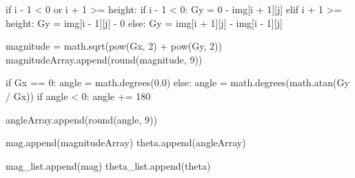 \documentclass[
  letterpaper,
  DIV=11,
  numbers=noendperiod]{scrreprt}
\newenvironment{Shaded}{\begin{snugshade}}{\end{snugshade}}
\newcommand{\BuiltInTok}[1]{\textcolor[rgb]{0.00,0.23,0.31}{#1}}
\newcommand{\ControlFlowTok}[1]{\textcolor[rgb]{0.00,0.23,0.31}{#1}}
\newcommand{\DecValTok}[1]{\textcolor[rgb]{0.68,0.00,0.00}{#1}}
\newcommand{\FloatTok}[1]{\textcolor[rgb]{0.68,0.00,0.00}{#1}}
\newcommand{\KeywordTok}[1]{\textcolor[rgb]{0.00,0.23,0.31}{#1}}
\newcommand{\NormalTok}[1]{\textcolor[rgb]{0.00,0.23,0.31}{#1}}
\newcommand{\OperatorTok}[1]{\textcolor[rgb]{0.37,0.37,0.37}{#1}}
\begin{document}
\begin{Shaded}
\begin{Highlighting}[]
            \ControlFlowTok{if}\NormalTok{ i }\OperatorTok{{-}} \DecValTok{1} \OperatorTok{\textless{}} \DecValTok{0} \KeywordTok{or}\NormalTok{ i }\OperatorTok{+} \DecValTok{1} \OperatorTok{\textgreater{}=}\NormalTok{ height:}
                \ControlFlowTok{if}\NormalTok{ i }\OperatorTok{{-}} \DecValTok{1} \OperatorTok{\textless{}} \DecValTok{0}\NormalTok{:}
\NormalTok{                    Gy }\OperatorTok{=} \DecValTok{0} \OperatorTok{{-}}\NormalTok{ img[i }\OperatorTok{+} \DecValTok{1}\NormalTok{][j]}
                \ControlFlowTok{elif}\NormalTok{ i }\OperatorTok{+} \DecValTok{1} \OperatorTok{\textgreater{}=}\NormalTok{ height:}
\NormalTok{                    Gy }\OperatorTok{=}\NormalTok{ img[i }\OperatorTok{{-}} \DecValTok{1}\NormalTok{][j] }\OperatorTok{{-}} \DecValTok{0}
            \ControlFlowTok{else}\NormalTok{:}
\NormalTok{                Gy }\OperatorTok{=}\NormalTok{ img[i }\OperatorTok{+} \DecValTok{1}\NormalTok{][j] }\OperatorTok{{-}}\NormalTok{ img[i }\OperatorTok{{-}} \DecValTok{1}\NormalTok{][j]}
                
\NormalTok{            magnitude }\OperatorTok{=}\NormalTok{ math.sqrt(}\BuiltInTok{pow}\NormalTok{(Gx, }\DecValTok{2}\NormalTok{) }\OperatorTok{+} \BuiltInTok{pow}\NormalTok{(Gy, }\DecValTok{2}\NormalTok{))}
\NormalTok{            magnitudeArray.append(}\BuiltInTok{round}\NormalTok{(magnitude, }\DecValTok{9}\NormalTok{))}
            
            \ControlFlowTok{if}\NormalTok{ Gx }\OperatorTok{==} \DecValTok{0}\NormalTok{:}
\NormalTok{                angle }\OperatorTok{=}\NormalTok{ math.degrees(}\FloatTok{0.0}\NormalTok{)}
            \ControlFlowTok{else}\NormalTok{:}
\NormalTok{                angle }\OperatorTok{=}\NormalTok{ math.degrees(math.atan(Gy }\OperatorTok{/}\NormalTok{ Gx))}
                \ControlFlowTok{if}\NormalTok{ angle }\OperatorTok{\textless{}} \DecValTok{0}\NormalTok{:}
\NormalTok{                    angle }\OperatorTok{+=} \DecValTok{180}
                    
\NormalTok{            angleArray.append(}\BuiltInTok{round}\NormalTok{(angle, }\DecValTok{9}\NormalTok{))}
            
\NormalTok{        mag.append(magnitudeArray)}
\NormalTok{        theta.append(angleArray)}
        
\NormalTok{    mag\_list.append(mag)}
\NormalTok{    theta\_list.append(theta)}
\end{Highlighting}
\end{Shaded}
\end{document}

